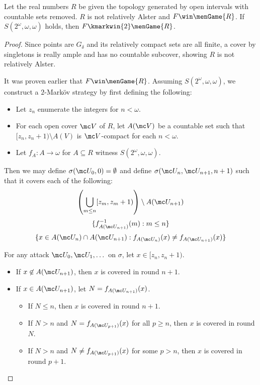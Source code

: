   \begin{ex}
    Let the real numbers $R$ be given the topology generated by open intervals with countable sets removed. $R$ is not relatively Alster and $F\win\menGame{R}$. If $S(2^\omega,\omega,\omega)$ holds, then $F\kmarkwin{2}\menGame{R}$.
  \end{ex}

  \begin{proof}
    Since points are $G_\delta$ and its relatively compact sets are all finite, a cover by singletons is really ample and has no countable subcover, showing $R$ is not relatively Alster.

    It was proven earlier that $F\win\menGame{R}$. Assuming $S(2^\omega,\omega,\omega)$, we construct a $2$-Mark\"ov strategy by first defining the following:
      \begin{itemize}
        \item Let $z_n$ enumerate the integers for $n<\omega$.
        \item For each open cover $\mc V$ of $R$, let $A(\mc V)$ be a countable set such that $[z_n,z_n+1)\setminus A(V)$ is $\mc V$-compact for each $n<\omega$.
        \item Let $f_A:A\to\omega$ for $A\subseteq R$ witness $S(2^\omega,\omega,\omega)$.
      \end{itemize}

    Then we may define $\sigma(\mc U_0,0)=\emptyset$ and define $\sigma(\mc U_n,\mc U_{n+1},n+1)$ such that it covers each of the following:
      \[
        \left(\bigcup_{m\leq n} [z_m,z_m+1)\right) \setminus A(\mc U_{n+1})
      \]
      \[
        \{f_{A(\mc U_{n+1})}^{-1}(m) : m\leq n\}
      \]
      \[
        \{x \in A(\mc U_n)\cap A(\mc U_{n+1}) : f_{A(\mc U_{n})}(x)\not= f_{A(\mc U_{n+1})}(x)\}
      \]

    For any attack $\mc U_0,\mc U_1,\dots$ on $\sigma$, let $x\in[z_n,z_n+1)$.
      \begin{itemize}
        \item If $x\not\in A(\mc U_{n+1})$, then $x$ is covered in round $n+1$.
        \item If $x\in A(\mc U_{n+1})$, let $N=f_{A(\mc U_{n+1})}(x)$.
        \begin{itemize}
          \item If $N\leq n$, then $x$ is covered in round $n+1$.
          \item If $N>n$ and $N=f_{A(\mc U_{p+1})}(x)$ for all $p\geq n$, then $x$ is covered in round $N$.
          \item If $N>n$ and $N\not=f_{A(\mc U_{p+1})}(x)$ for some $p>n$, then $x$ is covered in round $p+1$.
        \end{itemize}
      \end{itemize}
  \end{proof}

